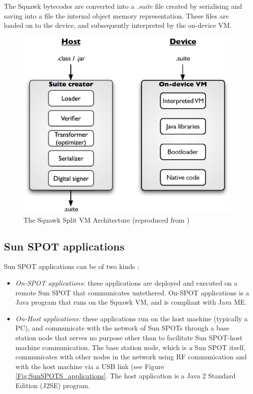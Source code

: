 The Squawk bytecodes are converted into a \emph{.suite} file created by
serialising and saving into a file the internal object memory representation.
These files are loaded on to the device, and subsequently interpreted by the
on-device VM.
  
\begin{figure}
\centering
\includegraphics[scale=0.61]{img/Squawk_architecture.eps} 
\caption[The Squawk Split VM Architecture]{The Squawk
Split VM Architecture (reproduced from \cite{simon_squawk:2006})}
\label{Fig:SquawkVM_architecture}
\end{figure}   
  

\subsection{Sun SPOT applications} \label{subsec:sunspotapps}

Sun SPOT applications can be of two kinds \cite{sun_developer:2008}:

\begin{itemize}
  \item \emph{On-SPOT applications:} these applications are deployed and
  executed on a remote Sun SPOT that communicates untethered. On-SPOT
  applications is a Java program that runs on the Squawk VM, and is compliant
  with Java ME. 
  \item \emph{On-Host applications:} these applications run on the host machine
  (typically a PC), and communicate with the network of Sun SPOTs through a base
  station node that serves no purpose other than to facilitate Sun SPOT-host
  machine communication. 
  The base station node, which is a Sun SPOT itself, communicates with other
  nodes in the network using RF communication and with the host machine via a
  USB link (see Figure \ref{Fig:SunSPOTS_applications}. The host application is a Java 2 Standard
  Edition (J2SE) program.

\end{itemize}

